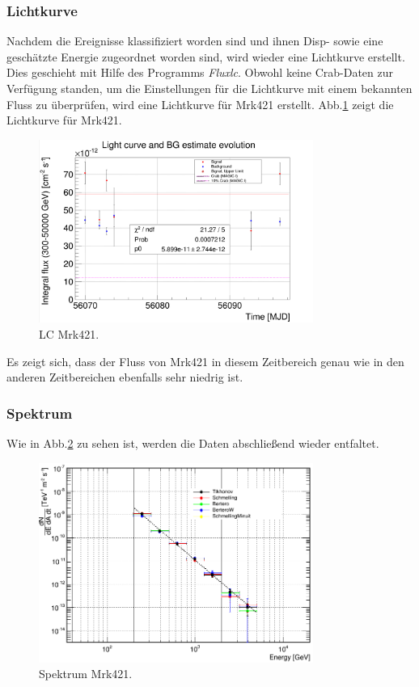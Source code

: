 \subsubsection{Lichtkurve}
Nachdem die Ereignisse klassifiziert worden sind und ihnen Disp- sowie eine geschätzte Energie zugeordnet worden sind, wird wieder eine Lichtkurve erstellt.
Dies geschieht mit Hilfe des Programms \textit{Fluxlc}.
Obwohl keine Crab-Daten zur Verfügung standen, um die Einstellungen für die Lichtkurve mit einem bekannten Fluss zu überprüfen, wird eine Lichtkurve für Mrk421 erstellt.
Abb.\ref{Datenset3_LC_Mrk421} zeigt die Lichtkurve für Mrk421.

\begin{figure}
    \centering
    \includegraphics[width=0.8\textwidth]{./Plots/04_MrkAnalyse/Datenset3/Datenset3_LC_Mrk421.png}
    \caption{LC Mrk421.}
    \label{Datenset3_LC_Mrk421}
\end{figure}

Es zeigt sich, dass der Fluss von Mrk421 in diesem Zeitbereich genau wie in den anderen Zeitbereichen ebenfalls sehr niedrig ist.


\subsubsection{Spektrum}

Wie in Abb.\ref{Datenset3_Spektrum_Mrk421} zu sehen ist, werden die Daten abschließend wieder entfaltet.

\begin{figure}
    \centering
    \includegraphics[width=0.8\textwidth]{./Plots/04_MrkAnalyse/Datenset3/Datenset3_Spektrum_Mrk421.png}
    \caption{Spektrum Mrk421.}
    \label{Datenset3_Spektrum_Mrk421}
\end{figure}

